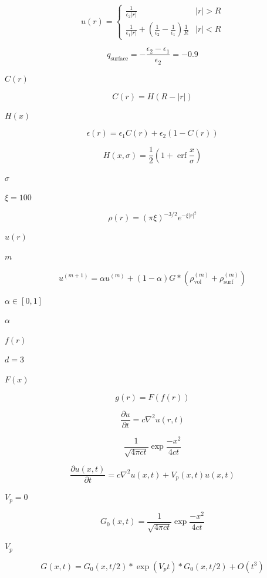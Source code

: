 \documentclass{article}
\begin{document}
\[
   u(r) =
          \left \lbrace
             \begin{array}{cc}
                  \frac{1}{\epsilon_2 |r|} & |r| > R \\
                  \frac{1}{\epsilon_1 |r|} + \left( \frac{1}{\epsilon_2} - \frac{1}{\epsilon_1} \right) \frac{1}{R}  & |r| < R
             \end{array}
          \right .
\]
\pagebreak

\[
   q_{\mbox{surface}} = -\frac{\epsilon_2 - \epsilon_1}{\epsilon_2} = -0.9
\]
\pagebreak

$C(r)$
\pagebreak

\[
  C(r) = H(R-|r|)
\]
\pagebreak

$H(x)$
\pagebreak

\[
   \epsilon(r) = \epsilon_1 C(r) + \epsilon_2 \left( 1 - C(r) \right)
\]
\pagebreak

\[
   H(x,\sigma) = \frac{1}{2} \left( 1 + \mathop{\mathrm{erf}} \frac{x}{\sigma} \right)
\]
\pagebreak

$\sigma$
\pagebreak

$\xi=100$
\pagebreak

\[
   \rho(r) = \left(\pi \xi \right)^{-3/2} e^{-\xi |r|^2}
\]
\pagebreak

$u(r)$
\pagebreak

$m$
\pagebreak

\[
   u^{(m+1)} = \alpha u^{(m)} + (1-\alpha) G * \left(\rho^{(m)}_{\mbox{vol}} + \rho^{(m)}_{\mbox{surf}} \right)
\]
\pagebreak

$ \alpha \in [0,1]$
\pagebreak

$\alpha$
\pagebreak

$f(r)$
\pagebreak

$d=3$
\pagebreak

$F(x)$
\pagebreak

\[
    g(r) = F(f(r))
\]
\pagebreak

\[
\frac{\partial u}{\partial t} = c \nabla^2 u(r,t)
\]
\pagebreak

\[
\frac{1}{\sqrt{4 \pi c t}}  \exp \frac{-x^2}{4 c t}
\]
\pagebreak

\[
  \frac{\partial u(x,t)}{\partial t} = c \nabla^2 u(x,t) + V_p(x,t) u(x,t)
\]
\pagebreak

$ V_p = 0 $
\pagebreak

\[
  G_0(x,t) = \frac{1}{\sqrt{4 \pi c t}} \exp \frac{-x^2}{4 c t}
\]
\pagebreak

$ V_p $
\pagebreak

\[
  G(x,t) = G_0(x,t/2) * \exp(V_p t) * G_0(x,t/2) + O(t^3)
\]
\pagebreak
\end{document}

